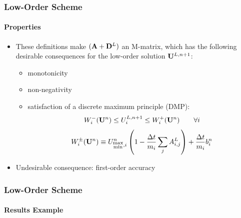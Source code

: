 \documentclass{beamer}
\begin{document}
\begin{frame}
\frametitle{Low-Order Scheme}
\framesubtitle{Properties}

\begin{itemize}
   \item These definitions make $(\mathbf{A} + \mathbf{D}^L)$ an M-matrix, which has
      the following desirable consequences for the low-order solution $\mathbf{U}^{L,n+1}$:
   \begin{itemize}
      \item monotonicity
      \item non-negativity
      \item satisfaction of a discrete maximum principle (DMP):
      \begin{equation}
         W_i^-(\mathbf{U}^n)\leq
         U_i^{L,n+1}\leq
         W_i^+(\mathbf{U}^n)\qquad\forall i
      \end{equation}
      \begin{equation}
         W_i^\pm(\mathbf{U}^n) \equiv U_{\substack{\max\\\min},i}^n\left(1-\frac{\Delta t}{m_i}
         \sum\limits_j A_{i,j}^L\right)
         + \frac{\Delta t}{m_i}b_i^n
      \end{equation}
   \end{itemize}
   \item Undesirable consequence: first-order accuracy
\end{itemize}

\end{frame}
\begin{frame}
\frametitle{Low-Order Scheme}
\framesubtitle{Results Example}


\end{frame}
\end{document}
